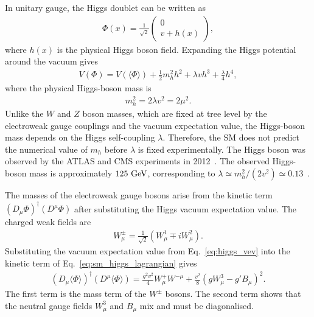 In unitary gauge, the Higgs doublet can be written as
\begin{align*}
    \Phi(x)
    =
    \frac{1}{\sqrt{2}}
    \begin{pmatrix}
        0 \\
        v+h(x)
    \end{pmatrix},
\end{align*}
where $h(x)$ is the physical Higgs boson field. 
Expanding the Higgs potential around the vacuum gives
\begin{align*}
    V(\Phi)
    =
    V(\langle\Phi\rangle)
    +
    \frac{1}{2}m_{h}^{2}h^{2}
    +
    \lambda v h^{3}
    +
    \frac{\lambda}{4}h^{4},
\end{align*}
where the physical Higgs-boson mass is
\begin{align*}
    m_{h}^{2}
    =
    2\lambda v^{2}
    =
    2\mu^{2}.
\end{align*}
Unlike the $W$ and $Z$ boson masses, which are fixed at tree level by the electroweak gauge couplings and the vacuum expectation value, the Higgs-boson mass depends on the Higgs self-coupling $\lambda$. 
Therefore, the SM does not predict the numerical value of $m_{h}$ before $\lambda$ is fixed experimentally. 
The Higgs boson was observed by the ATLAS and CMS experiments in 2012~\cite{ATLAS2012Higgs,CMS2012Higgs}. 
The observed Higgs-boson mass is approximately $125~\mathrm{GeV}$, corresponding to $\lambda\simeq m_{h}^{2}/(2v^{2})\simeq0.13$~\cite{ATLASCMSHiggsMass2015}.

The masses of the electroweak gauge bosons arise from the kinetic term $(D_{\mu}\Phi)^{\dagger}(D^{\mu}\Phi)$ after substituting the Higgs vacuum expectation value. 
The charged weak fields are
\begin{align*}
    W_{\mu}^{\pm}
    =
    \frac{1}{\sqrt{2}}
    \left(
        W_{\mu}^{1}
        \mp
        iW_{\mu}^{2}
    \right).
\end{align*}
Substituting the vacuum expectation value from Eq.~\eqref{eq:higgs_vev} into the kinetic term of Eq.~\eqref{eq:sm_higgs_lagrangian} gives
\begin{align*}
    (D_{\mu}\langle\Phi\rangle)^{\dagger}
    (D^{\mu}\langle\Phi\rangle)
    =
    \frac{g^{2}v^{2}}{4}W_{\mu}^{+}W^{-\mu}
    +
    \frac{v^{2}}{8}
    \left(
        gW_{\mu}^{3}
        -
        g'B_{\mu}
    \right)^{2}.
\end{align*}
The first term is the mass term of the $W^{\pm}$ bosons. 
The second term shows that the neutral gauge fields $W_{\mu}^{3}$ and $B_{\mu}$ mix and must be diagonalised.

